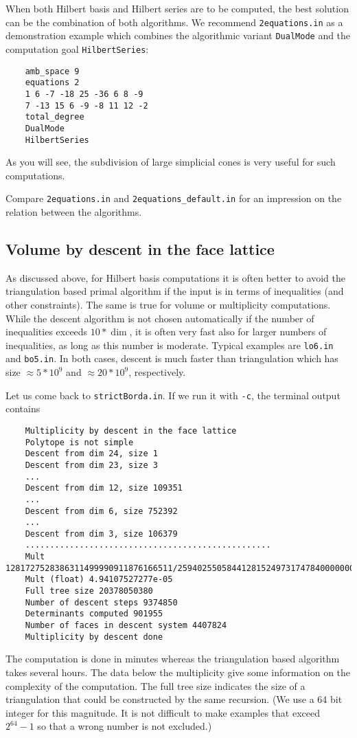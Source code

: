 \documentclass[12pt,a4paper]{scrartcl}
\theoremstyle{definition}
\begin{document}
{	When both Hilbert basis and Hilbert series are to be computed, the best solution can be the combination of both algorithms. We recommend \verb|2equations.in| as a demonstration example which combines the algorithmic variant \verb|DualMode| and the computation goal \verb|HilbertSeries|:
	\begin{Verbatim}
	amb_space 9
	equations 2
	1 6 -7 -18 25 -36 6 8 -9
	7 -13 15 6 -9 -8 11 12 -2
	total_degree
	DualMode
	HilbertSeries
	\end{Verbatim}
	As you will see, the subdivision of large simplicial cones is very useful for such computations.
	
	Compare \verb|2equations.in| and \verb|2equations_default.in| for an impression on the relation between the algorithms.
	
	\subsection{Volume by descent in the face lattice}\label{descent}
	
	As discussed above, for Hilbert basis computations it is often better to avoid the triangulation based primal algorithm if the input is in terms of inequalities (and other constraints). The same is true for volume or multiplicity computations. 
	While the descent algorithm is not chosen automatically if the number of inequalities exceeds $10*\dim$, it is often very fast also for larger numbers of inequalities, as long as this number  is moderate. Typical examples are \verb|lo6.in| and \verb|bo5.in|. In both cases, descent is much faster than triangulation which has size $\approx 5*10^9$ and $\approx 20*10^9$, respectively.
	
	Let us come back to \verb|strictBorda.in|. If we run it with \verb|-c|, the terminal output contains
	\begin{Verbatim}
	Multiplicity by descent in the face lattice
	Polytope is not simple
	Descent from dim 24, size 1
	Descent from dim 23, size 3
	...
	Descent from dim 12, size 109351
	...
	Descent from dim 6, size 752392
	...
	Descent from dim 3, size 106379
	..................................................
	Mult 1281727528386311499990911876166511/25940255058441281524973174784000000000
	Mult (float) 4.94107527277e-05
	Full tree size 20378050380
	Number of descent steps 9374850
	Determinants computed 901955
	Number of faces in descent system 4407824
	Multiplicity by descent done
	\end{Verbatim}
	The computation is done in minutes whereas the triangulation based algorithm takes several hours. The data below the multiplicity give some information on the complexity of the computation. The full tree size indicates the size of a triangulation that could be constructed by the same recursion. (We use a 64 bit integer for this magnitude. It is not difficult to make examples that exceed $2^{64}-1$ so that a wrong number is not excluded.)
	
}
\end{document}
